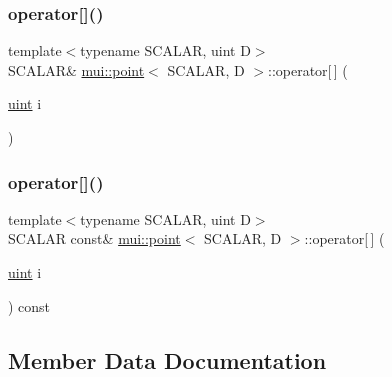 \mbox{\label{structmui_1_1point_a935bfe6fb4ef5bb8ab5f05500eee9b66}} 
\subsubsection{\texorpdfstring{operator[]()}{operator[]()}\hspace{0.1cm}{\footnotesize\ttfamily [1/2]}}
{\footnotesize\ttfamily template$<$typename S\+C\+A\+L\+AR, uint D$>$ \\
S\+C\+A\+L\+AR\& \hyperlink{structmui_1_1point}{mui\+::point}$<$ S\+C\+A\+L\+AR, D $>$\+::operator\mbox{[}$\,$\mbox{]} (\begin{DoxyParamCaption}\item[{\hyperlink{namespacemui_af15a3e7188a2117fb9965277bb0cacd2}{uint}}]{i }\end{DoxyParamCaption})\hspace{0.3cm}{\ttfamily [inline]}}

\mbox{\label{structmui_1_1point_ab12e0d42a9be6a99e4eb43738a6aab16}} 
\subsubsection{\texorpdfstring{operator[]()}{operator[]()}\hspace{0.1cm}{\footnotesize\ttfamily [2/2]}}
{\footnotesize\ttfamily template$<$typename S\+C\+A\+L\+AR, uint D$>$ \\
S\+C\+A\+L\+AR const\& \hyperlink{structmui_1_1point}{mui\+::point}$<$ S\+C\+A\+L\+AR, D $>$\+::operator\mbox{[}$\,$\mbox{]} (\begin{DoxyParamCaption}\item[{\hyperlink{namespacemui_af15a3e7188a2117fb9965277bb0cacd2}{uint}}]{i }\end{DoxyParamCaption}) const\hspace{0.3cm}{\ttfamily [inline]}}



\subsection{Member Data Documentation}
\mbox{\label{structmui_1_1point_a5590d1e5d4ce5ae52b9225d8a1b189cb}} 
